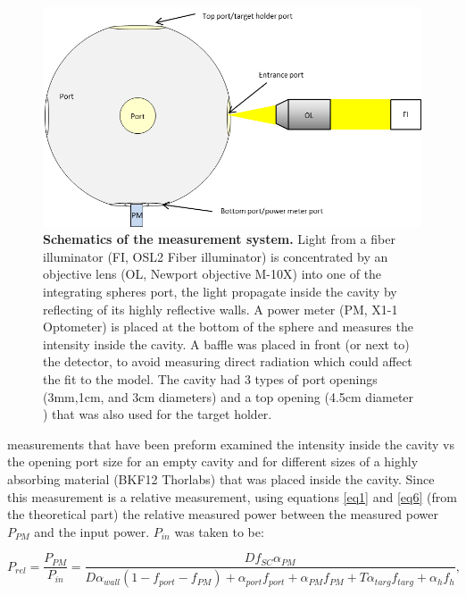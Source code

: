 \documentclass[a4paper]{article}
\begin{document}
\begin{figure}
\centering
\includegraphics[width=1\textwidth]{figures/cavity_measurement_system.png}
\caption{\textbf{Schematics of the measurement system.} Light from a fiber illuminator (FI, OSL2 Fiber illuminator)  is concentrated by an objective lens (OL, Newport objective M-10X) into one of the integrating spheres port, the light propagate inside the cavity by reflecting of its highly reflective walls. A power meter (PM, X1-1 Optometer) is placed at the bottom of the sphere and measures the intensity inside the cavity. A baffle was placed in front (or next to) the detector, to avoid measuring direct radiation which could affect the fit to the model. The cavity had 3 types of port openings (3mm,1cm, and 3cm diameters) and a top opening (4.5cm diameter ) that was also used for the target holder.}
\label{fig:setup}
\end{figure}

measurements that have been preform examined the intensity inside the cavity vs the opening port size for an empty cavity and for different sizes of a highly absorbing material (BKF12 Thorlabs) that was placed inside the cavity. Since this measurement is a relative measurement, using equations \ref{eq1} and \ref{eq6} (from the theoretical part) the relative measured power between the measured power $P_{PM}$ and the input power. $P_{in}$ was taken to be:

\begin{equation}\label{eq_measurement}
P_{rel}=\frac{P_{PM}}{P_{in}}=\frac{Df_{SC} \alpha_{PM}}{D\alpha_{wall} (1-f_{port}-f_{PM})+\alpha_{port} f_{port}+\alpha_{PM} f_{PM}+T\alpha_{targ} f_{targ}+\alpha_{h} f_{h}} ,
\end{equation}
\end{document}
